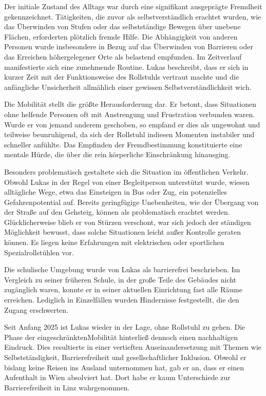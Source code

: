 Der initiale Zustand des Alltags war durch eine signifikant ausgeprägte Fremdheit gekennzeichnet. 
Tätigkeiten, die zuvor als selbstverständlich erachtet wurden, wie das Überwinden von Stufen oder das selbstständige Bewegen über unebene Flächen, erforderten plötzlich fremde Hilfe. Die Abhängigkeit von anderen Personen wurde insbesondere in Bezug auf das Überwinden von Barrieren oder das Erreichen höhergelegener Orte als belastend empfunden. Im Zeitverlauf manifestierte sich eine zunehmende Routine. Lukas beschreibt, dass er sich in kurzer Zeit mit der Funktionsweise des Rollstuhls vertraut machte und die anfängliche Unsicherheit allmählich einer gewissen Selbstverständlichkeit wich.

Die Mobilität stellt die größte Herausforderung dar. Er betont, dass Situationen ohne helfende Personen oft mit Anstrengung und Frustration verbunden waren. Wurde er von jemand anderem geschoben, so empfand er dies als ungewohnt und teilweise beunruhigend, da sich der Rollstuhl indiesen Momenten instabiler und schneller anfühlte. Das Empfinden der Fremdbestimmung konstituierte eine mentale Hürde, die über die rein körperliche Einschränkung hinausging.

Besonders problematisch gestaltete sich die Situation im öffentlichen Verkehr. Obwohl Lukas in der Regel von einer Begleitperson unterstützt wurde, wiesen alltägliche Wege, etwa das Einsteigen in Bus oder Zug, ein potenzielles Gefahrenpotential auf. Bereits geringfügige Unebenheiten, wie der Übergang von der Straße auf den Gehsteig, können als problematisch erachtet werden. Glücklicherweise blieb er von Stürzen verschont, war sich jedoch der ständigen Möglichkeit bewusst, dass solche Situationen leicht außer Kontrolle geraten können. Es liegen keine Erfahrungen mit elektrischen oder 
sportlichen Spezialrollstühlen vor. 

Die schulische Umgebung wurde von Lukas als barrierefrei beschrieben. Im Vergleich zu seiner früheren Schule, in der große Teile des Gebäudes nicht zugänglich waren, konnte er in seiner aktuellen Einrichtung fast alle Räume erreichen. Lediglich in Einzelfällen wurden Hindernisse festgestellt, die den Zugang erschwerten.

Seit Anfang 2025 ist Lukas wieder in der Lage, ohne Rollstuhl zu gehen. Die Phase der eingeschränktenMobilität hinterließ dennoch einen nachhaltigen Eindruck. Dies resultierte in einer vertieften Auseinandersetzung mit Themen wie Selbstständigkeit, Barrierefreiheit und gesellschaftlicher Inklusion. Obwohl er bislang keine Reisen ins Ausland unternommen hat, gab er an, dass er einen Aufenthalt in Wien absolviert hat. Dort habe er kaum Unterschiede zur Barrierefreiheit in Linz wahrgenommen.

